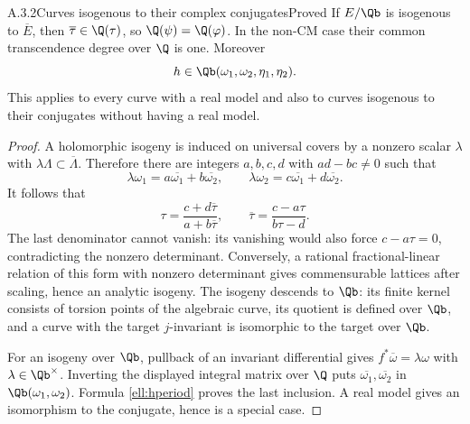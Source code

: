 \begin{result}{A.3.2}{Curves isogenous to their complex conjugates}{Proved}
If $E/\Qb$ is isogenous to $\overline E$, then $\overline\tau\in\Q(\tau)$, so $\Q(\psi)=\Q(\varphi)$. In the non-CM case their common transcendence degree over $\Q$ is one. Moreover
\[
 h\in\Qb(\omega_1,\omega_2,\eta_1,\eta_2).
\]
This applies to every curve with a real model and also to curves isogenous to their conjugates without having a real model.
\end{result}
\begin{proof}
A holomorphic isogeny is induced on universal covers by a nonzero scalar $\lambda$ with $\lambda\Lambda\subset\overline\Lambda$. Therefore there are integers $a,b,c,d$ with $ad-bc\ne0$ such that
\[
 \lambda\omega_1=a\overline{\omega_1}+b\overline{\omega_2},
 \qquad \lambda\omega_2=c\overline{\omega_1}+d\overline{\omega_2}.
\]
It follows that
\[
 \tau=\frac{c+d\overline\tau}{a+b\overline\tau},
 \qquad \overline\tau=\frac{c-a\tau}{b\tau-d}.
\]
The last denominator cannot vanish: its vanishing would also force $c-a\tau=0$, contradicting the nonzero determinant. Conversely, a rational fractional-linear relation of this form with nonzero determinant gives commensurable lattices after scaling, hence an analytic isogeny. The isogeny descends to $\Qb$: its finite kernel consists of torsion points of the algebraic curve, its quotient is defined over $\Qb$, and a curve with the target $j$-invariant is isomorphic to the target over $\Qb$.

For an isogeny over $\Qb$, pullback of an invariant differential gives $f^*\overline\omega=\lambda\omega$ with $\lambda\in\Qb^\times$. Inverting the displayed integral matrix over $\Q$ puts $\overline{\omega_1},\overline{\omega_2}$ in $\Qb(\omega_1,\omega_2)$. Formula \eqref{ell:hperiod} proves the last inclusion. A real model gives an isomorphism to the conjugate, hence is a special case.
\end{proof}


